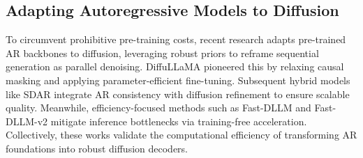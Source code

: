 \documentclass[11pt]{article}
\begin{document}
\subsection{Adapting Autoregressive Models to Diffusion} 



To circumvent prohibitive pre-training costs, recent research adapts pre-trained AR backbones to diffusion, leveraging robust priors to reframe sequential generation as parallel denoising.
DiffuLLaMA \citep{diffullama} pioneered this by relaxing causal masking and applying parameter-efficient fine-tuning. Subsequent hybrid models like SDAR \citep{sdar} integrate AR consistency with diffusion refinement to ensure scalable quality. Meanwhile, efficiency-focused methods such as Fast-DLLM \citep{wu2025fast} and Fast-DLLM-v2 \citep{wu2025fastv2} mitigate inference bottlenecks via training-free acceleration. Collectively, these works validate the computational efficiency of transforming AR foundations into robust diffusion decoders.

\end{document}
